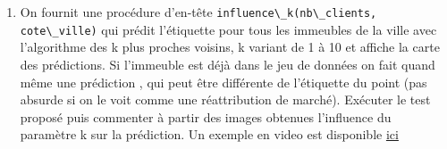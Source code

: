 \documentclass[
  11pt,
]{article}
\newcommand{\passthrough}[1]{#1}
\providecommand{\tightlist}{%
  \setlength{\itemsep}{0pt}\setlength{\parskip}{0pt}}
\newcounter{thme}
\newcounter{prop}
\newcounter{def}
\newcounter{alg}
\begin{document}
\begin{enumerate}
\def\labelenumi{\arabic{enumi}.}
\setcounter{enumi}{6}
\tightlist
\item
  On fournit une procédure d'en-tête
  \passthrough{\lstinline!influence\_k(nb\_clients,  cote\_ville)!} qui
  prédit l'étiquette pour tous les immeubles de la ville avec
  l'algorithme des k plus proches voisins, k variant de 1 à 10 et
  affiche la carte des prédictions. Si l'immeuble est déjà dans le jeu
  de données on fait quand même une prédiction , qui peut être
  différente de l'étiquette du point (pas absurde si on le voit comme
  une réattribution de marché). Exécuter le test proposé puis commenter
  à partir des images obtenues l'influence du paramètre k sur la
  prédiction. Un exemple en video est disponible
  \href{images/KNN-Influence-de-k.gif}{ici}
\end{enumerate}
\end{document}
